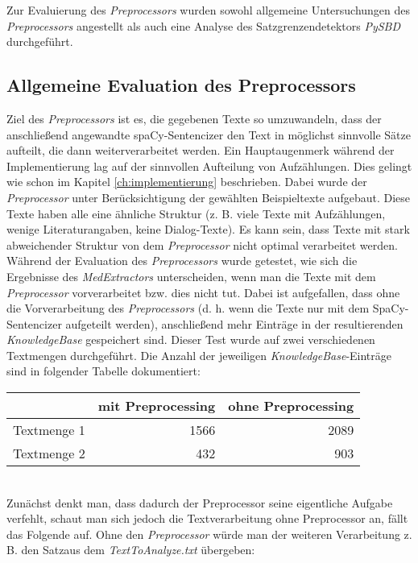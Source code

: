 Zur Evaluierung des \emph{Preprocessors} wurden sowohl allgemeine Untersuchungen des \emph{Preprocessors} angestellt als auch eine Analyse des Satzgrenzendetektors \emph{PySBD} durchgeführt.

\subsection{Allgemeine Evaluation des Preprocessors}
\label{sec:evaluation_preprocessor}

Ziel des \emph{Preprocessors} ist es, die gegebenen Texte so umzuwandeln, dass der anschließend angewandte spaCy-Sentencizer den Text in möglichst sinnvolle Sätze aufteilt, die dann weiterverarbeitet werden. Ein Hauptaugenmerk während der Implementierung lag auf der sinnvollen Aufteilung von Aufzählungen. Dies gelingt wie schon im Kapitel \ref{ch:implementierung} beschrieben. Dabei wurde der \emph{Preprocessor} unter Berücksichtigung der gewählten Beispieltexte aufgebaut. Diese Texte haben alle eine ähnliche Struktur (z. B. viele Texte mit Aufzählungen, wenige Literaturangaben, keine Dialog-Texte). Es kann sein, dass Texte mit stark abweichender Struktur von dem \emph{Preprocessor} nicht optimal verarbeitet werden.\\

Während der Evaluation des \emph{Preprocessors} wurde getestet, wie sich die Ergebnisse des \emph{MedExtractors} unterscheiden, wenn man die Texte mit dem \emph{Preprocessor} vorverarbeitet bzw. dies nicht tut. 
Dabei ist aufgefallen, dass ohne die Vorverarbeitung des \emph{Preprocessors} (d. h. wenn die Texte nur mit dem SpaCy-Sentencizer aufgeteilt werden), anschließend mehr Einträge in der resultierenden \emph{KnowledgeBase} gespeichert sind. Dieser Test wurde auf zwei verschiedenen Textmengen durchgeführt. Die Anzahl der jeweiligen \emph{KnowledgeBase}-Einträge sind in folgender Tabelle dokumentiert:

\begin{tabular}[h]{lrr}
	\hline
	& mit Preprocessing & ohne Preprocessing\\
	\hline
	Textmenge 1 & 1566 & 2089 \\
	Textmenge 2 & 432 & 903\\
	\hline
\end{tabular}\\

Zunächst denkt man, dass dadurch der Preprocessor seine eigentliche Aufgabe verfehlt, schaut man sich jedoch die Textverarbeitung ohne Preprocessor an, fällt das Folgende auf.
Ohne den \emph{Preprocessor} würde man der weiteren Verarbeitung z. B. den \glqq Satz\grqq aus dem \emph{TextToAnalyze.txt} übergeben:

